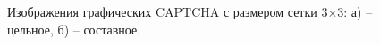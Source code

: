 \begin{figure}[H]
    \begin{minipage}[h]{0.49\linewidth}
    \end{minipage}
    \hfill
    \begin{minipage}[h]{0.49\linewidth}
    \end{minipage}
    \caption{Изображения графических CAPTCHA с размером сетки 3×3: а) -- цельное, б) -- составное.}
    \label{fig:example}
\end{figure}
\vspace{-0.85cm}

